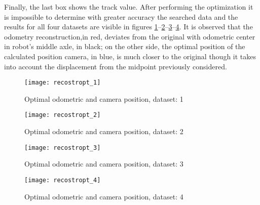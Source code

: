 Finally, the last box shows the track value.
After performing the optimization it is impossible to determine with greater accuracy the searched data and the results for all four datasets are visible in figures \ref{fig:OptiOdo1}--\ref{fig:OptiOdo2}--\ref{fig:OptiOdo3}--\ref{fig:OptiOdo4}.
It is observed that the odometry reconstruction,in red, deviates from the original with odometric center in robot's middle axle, in black; on the other side, the optimal position of the calculated position camera, in blue, is much closer to the original though it takes into account the displacement from the midpoint previously considered.
\begin{figure}[htb]
   {\texttt{[image: recostropt\_1]}}
   \caption{Optimal odometric and camera position, dataset: 1}
   \label{fig:OptiOdo1}
\end{figure}

\begin{figure}[h]
   {\texttt{[image: recostropt\_2]}}
   \caption{Optimal odometric and camera position, dataset: 2}
   \label{fig:OptiOdo2}
\end{figure}

\begin{figure}[h]
   {\texttt{[image: recostropt\_3]}} 
   \caption{Optimal odometric and camera position, dataset: 3}
   \label{fig:OptiOdo3}
\end{figure}

\begin{figure}[h]
   {\texttt{[image: recostropt\_4]}}
\caption{Optimal odometric and camera position, dataset: 4}
\label{fig:OptiOdo4}
\end{figure}